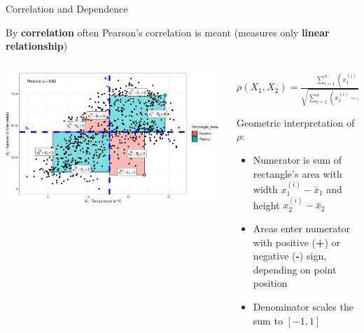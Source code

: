 \documentclass[11pt,compress,t,notes=noshow, aspectratio=169, xcolor=table]{beamer}
\begin{document}
\begin{frame}{Correlation and Dependence}

By \textbf{correlation} often Pearson's correlation is meant (measures only \textbf{linear relationship}) %




\begin{columns}[c, totalwidth=\textwidth]
\begin{column}{0.5\linewidth}
\includegraphics[width = \textwidth]{figure/pearson_cor}
\end{column}
\begin{column}{0.5\linewidth}

\centerline{$\rho(X_1, X_2) = \tfrac{\sum_{i=1}^{n}{(x_1^{(i)}-\bar{x}_1) \cdot (x_2^{(i)}-\bar{x}_2)}}{\sqrt{\sum_{i=1}^{n}{(x_1^{(i)}-\bar{x}_1)^2 \sum_{i=1}^{n}{(x_2^{(i)}-\bar{x}_2)^2 }}}} \in [-1, 1]$}

\medskip

Geometric interpretation of $\rho$:
\begin{itemize}
    \item Numerator is sum of rectangle's area with width $x_1^{(i)}-\bar{x}_1$ and height $x_2^{(i)}-\bar{x}_2$
    \item Areas enter numerator with positive (\textbf{+}) or negative (\textbf{-}) sign, depending on point position
    \item Denominator scales the sum to $ [-1, 1]$
\end{itemize}
\end{column}
\end{columns}


\end{frame}
\end{document}
